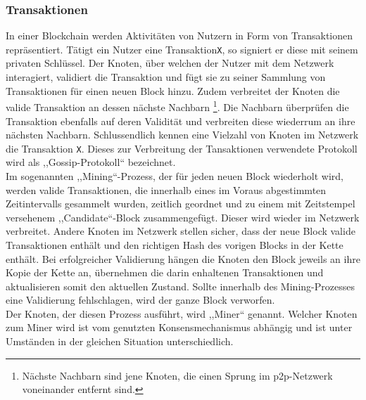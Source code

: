     \subsubsection{Transaktionen}
    \label{sec:sota_blockchain_trx}
    In einer Blockchain werden Aktivitäten von Nutzern in Form von Transaktionen repräsentiert.
    Tätigt ein Nutzer eine Transaktion\colorbox{light-gray}{\lstinline{X}}, so signiert er diese mit seinem privaten Schlüssel.
    Der Knoten, über welchen der Nutzer mit dem Netzwerk interagiert, validiert die Transaktion und fügt sie zu seiner Sammlung von Transaktionen für einen neuen Block hinzu.
    Zudem verbreitet der Knoten die valide Transaktion an dessen nächste Nachbarn
    \!\footnote{Nächste Nachbarn sind jene Knoten, die einen Sprung im \gls{p2p}-Netzwerk voneinander entfernt sind.}.
    Die Nachbarn überprüfen die Transaktion ebenfalls auf deren Validität und verbreiten diese wiederrum an ihre nächsten Nachbarn. 
    Schlussendlich kennen eine Vielzahl von Knoten im Netzwerk die Transaktion \colorbox{light-gray}{\lstinline{X}}. 
    Dieses zur Verbreitung der Tansaktionen verwendete Protokoll wird als ,,Gossip-Protokoll`` bezeichnet.\cite{Christidis2016}
    \medskip\\
    Im sogenannten ,,Mining``-Prozess, der für jeden neuen Block wiederholt wird, werden valide Transaktionen, die innerhalb eines im Voraus abgestimmten Zeitintervalls gesammelt wurden, zeitlich geordnet und zu einem mit Zeitstempel versehenem ,,Candidate``-Block zusammengefügt.
    Dieser wird wieder im Netzwerk verbreitet. 
    Andere Knoten im Netzwerk stellen sicher, dass der neue Block valide Transaktionen enthält und den richtigen Hash des vorigen Blocks in der Kette enthält. 
    Bei erfolgreicher Validierung hängen die Knoten den Block jeweils an ihre Kopie der Kette an, übernehmen die darin enhaltenen Transaktionen und aktualisieren somit den aktuellen Zustand. 
    Sollte innerhalb des Mining-Prozesses eine Validierung fehlschlagen, wird der ganze Block verworfen.\cite{Christidis2016}\\
    Der Knoten, der diesen Prozess ausführt, wird ,,Miner`` genannt.
    Welcher Knoten zum Miner wird ist vom genutzten Konsensmechanismus abhängig und ist unter Umständen in der gleichen Situation unterschiedlich.\cite{Christidis2016}
    \newpage
